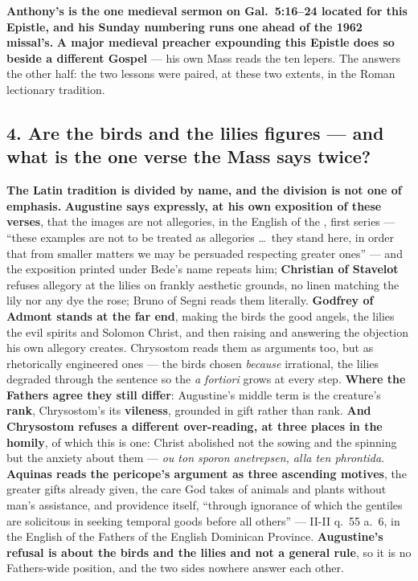 \textbf{Anthony's is the one medieval sermon on Gal.\ 5:16--24 located for
this Epistle, and his Sunday numbering runs one ahead of the 1962 missal's.}
\textbf{A major medieval preacher expounding this Epistle does so
beside a different Gospel} --- his own Mass reads the ten lepers. The
 answers the other half: the two lessons were paired, at
these two extents, in the Roman lectionary tradition.

\subsection*{4. Are the birds and the lilies figures --- and what is the one verse the Mass says twice?}

\textbf{The Latin tradition is divided by name, and the division is not one of
emphasis.} \textbf{Augustine says expressly, at his own exposition of these
verses}, that the images are not allegories, in the English of the , first series --- ``these examples are not to be
treated as allegories \dots\ they stand here, in order that from smaller matters
we may be persuaded respecting greater ones'' --- and the exposition printed
under Bede's name repeats him; \textbf{Christian of
Stavelot} refuses allegory at the lilies on frankly aesthetic grounds, no linen
matching the lily nor any dye the rose; Bruno of Segni reads them literally.
\textbf{Godfrey of Admont stands at the far end}, making the birds the good
angels, the lilies the evil spirits and Solomon Christ, and then raising and
answering the objection his own allegory creates. Chrysostom reads them as
arguments too, but as rhetorically engineered ones --- the birds chosen
\emph{because} irrational, the lilies degraded through the sentence so the
\emph{a fortiori} grows at every step. \textbf{Where the Fathers agree they
still differ}: Augustine's middle term is the creature's \textbf{rank},
Chrysostom's its \textbf{vileness}, grounded in gift rather than rank.
\textbf{And Chrysostom refuses a different over-reading, at three places in the
homily}, of which this is one:
Christ abolished not the sowing and the spinning but the anxiety about them ---
\emph{ou ton sporon anetrepsen, alla ten phrontida}. \textbf{Aquinas reads the
pericope's argument as three ascending motives}, the greater gifts already
given, the care God takes of animals and plants without man's assistance, and
providence itself, ``through ignorance of which the gentiles are solicitous in
seeking temporal goods before all others'' ---  II-II
q.~55 a.~6, in the English of the Fathers of the English Dominican Province.
\textbf{Augustine's refusal is about
the birds and the lilies and not a general rule}, so it is no Fathers-wide
position, and the two sides nowhere answer each other.

